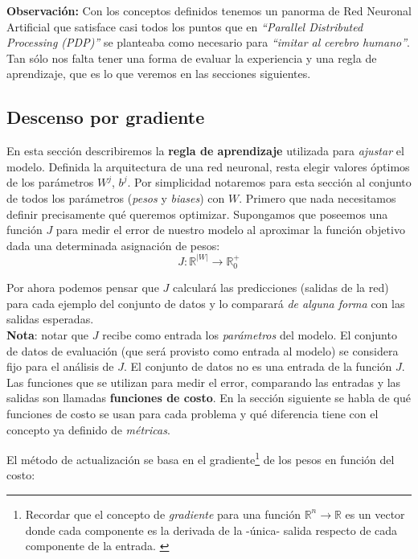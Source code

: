 \textbf{Observación:} Con los conceptos definidos tenemos un panorma de Red Neuronal Artificial que satisface casi todos los puntos que en \textit{``Parallel Distributed Processing (PDP)''} \cite{PDP} se planteaba como necesario para \textit{``imitar al cerebro humano''}. Tan sólo nos falta tener una forma de evaluar la experiencia y una regla de aprendizaje, que es lo que veremos en las secciones siguientes.

\subsection{Descenso por gradiente} \label{subsection:descenso-gradiente}

En esta sección describiremos la \textbf{regla de aprendizaje} utilizada para \textit{ajustar} el modelo. Definida la arquitectura de una red neuronal, resta elegir valores óptimos de los parámetros $W^j$, $b^j$. Por simplicidad notaremos para esta sección al conjunto de todos los parámetros (\textit{pesos} y \textit{biases}) con $W$. Primero que nada necesitamos definir precisamente qué queremos optimizar. Supongamos que poseemos una función $J$ para medir el error de nuestro modelo al aproximar la función objetivo dada una determinada asignación de pesos: 
\begin{equation*}
    J :  \mathbb{R}^{|W|} \rightarrow \mathbb{R}_0^+
\end{equation*}

Por ahora podemos pensar que $J$ calculará las predicciones (salidas de la red) para cada ejemplo del conjunto de datos y lo comparará \textit{de alguna forma} con las salidas esperadas. \\

\textbf{Nota}: notar que $J$ recibe como entrada los \textit{parámetros} del modelo. El conjunto de datos de evaluación (que será provisto como entrada al modelo) se considera fijo para el análisis de $J$. El conjunto de datos no es una entrada de la función $J$.\\

Las funciones que se utilizan para medir el error, comparando las entradas y las salidas son llamadas \textbf{funciones de costo}. En la sección siguiente se habla de qué funciones de costo se usan para cada problema y qué diferencia tiene con el concepto ya definido de \textit{métricas}. 

El método de actualización se basa en el gradiente\footnote{Recordar que el concepto de \textit{gradiente} para una función $\mathbb{R}^n \rightarrow \mathbb{R}$ es un vector donde cada componente es la derivada de la -única- salida respecto de cada componente de la entrada. \cite{apostol} \cite{math-ml} } de los pesos en función del costo:


